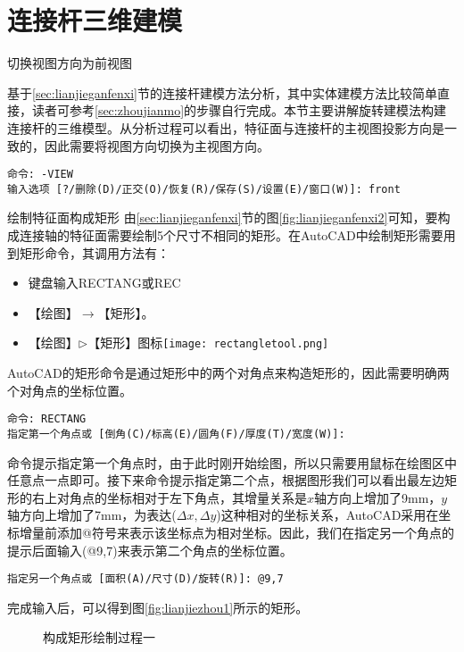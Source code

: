 \section{连接杆三维建模}
\begin{procedure}
\item 切换视图方向为前视图

基于\ref{sec:lianjieganfenxi}节的连接杆建模方法分析，其中实体建模方法比较简单直接，读者可参考\ref{sec:zhoujianmo}的步骤自行完成。本节主要讲解旋转建模法构建连接杆的三维模型。从分析过程可以看出，特征面与连接杆的主视图投影方向是一致的，因此需要将视图方向切换为主视图方向。
\begin{lstlisting}
命令: -VIEW
输入选项 [?/删除(D)/正交(O)/恢复(R)/保存(S)/设置(E)/窗口(W)]: front 
\end{lstlisting}

\item 绘制特征面构成矩形
由\ref{sec:lianjieganfenxi}节的图\ref{fig:lianjieganfenxi2}可知，要构成连接轴的特征面需要绘制5个尺寸不相同的矩形。在AutoCAD中绘制矩形需要用到矩形命令，其调用方法有：
\begin{itemize}
\item 键盘输入RECTANG或REC
\item 【绘图】$\rightarrow$【矩形】。
\item 【绘图】$\triangleright$【矩形】图标\texttt{[image: rectangletool.png]}
\end{itemize}

AutoCAD的矩形命令是通过矩形中的两个对角点来构造矩形的，因此需要明确两个对角点的坐标位置。
\begin{lstlisting}
命令: RECTANG
指定第一个角点或 [倒角(C)/标高(E)/圆角(F)/厚度(T)/宽度(W)]:
\end{lstlisting}
命令提示指定第一个角点时，由于此时刚开始绘图，所以只需要用鼠标在绘图区中任意点一点即可。接下来命令提示指定第二个点，根据图形我们可以看出最左边矩形的右上对角点的坐标相对于左下角点，其增量关系是$x$轴方向上增加了9mm，$y$轴方向上增加了7mm，为表达($\Delta x,\Delta y$)这种相对的坐标关系，AutoCAD采用在坐标增量前添加@符号来表示该坐标点为相对坐标。因此，我们在指定另一个角点的提示后面输入(@9,7)来表示第二个角点的坐标位置。
\begin{lstlisting}
指定另一个角点或 [面积(A)/尺寸(D)/旋转(R)]: @9,7
\end{lstlisting}
完成输入后，可以得到图\ref{fig:lianjiezhou1}所示的矩形。

\begin{figure}[htbp]
\centering
{}\hspace{20pt}
\hspace{20pt}
\caption{构成矩形绘制过程一}
\end{figure}


\end{procedure}

